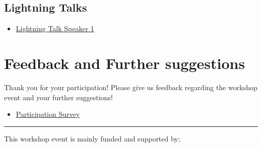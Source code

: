 \documentclass[
  letterpaper,
  DIV=11,
  numbers=noendperiod]{scrartcl}
\providecommand{\tightlist}{%
  \setlength{\itemsep}{0pt}\setlength{\parskip}{0pt}}\usepackage{longtable,booktabs,array}
\begin{document}
\hypertarget{lightning-talks}{%
\subsection{Lightning Talks}\label{lightning-talks}}

\begin{itemize}
\tightlist
\item
  \href{}{Lightning Talk Speaker 1}
\end{itemize}

\hypertarget{feedback-and-further-suggestions}{%
\section{Feedback and Further
suggestions}\label{feedback-and-further-suggestions}}

Thank you for your participation! Please give us feedback regarding the
workshop event and your further suggestions!

\begin{itemize}
\tightlist
\item
  \href{}{Participation Survey}
\end{itemize}

\begin{center}\rule{0.5\linewidth}{0.5pt}\end{center}

This workshop event is mainly funded and supported by;
\end{document}
